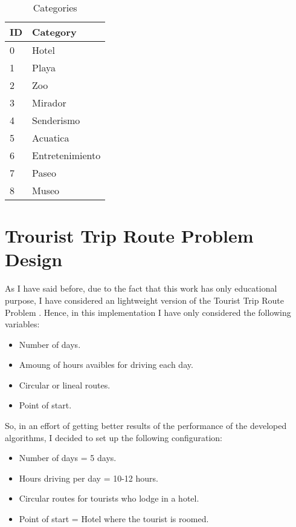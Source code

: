 \documentclass[preprint,14pt]{elsarticle}
\begin{document}
\begin{table}[H]
\centering
\begin{tabular}{@{}|l|l|@{}}
\toprule
ID & Category        \\ \midrule
0  & Hotel           \\ \midrule
1  & Playa           \\ \midrule
2  & Zoo             \\ \midrule
3  & Mirador         \\ \midrule
4  & Senderismo      \\ \midrule
5  & Acuatica        \\ \midrule
6  & Entretenimiento \\ \midrule
7  & Paseo           \\ \midrule
8  & Museo           \\ \bottomrule
\end{tabular}
\caption{Categories}
\label{my-label}
\end{table}

\section{Trourist Trip Route Problem Design}
\label{S:VRP}
As I have said before, due to the fact that this work has only educational purpose, I have considered an lightweight version of the Tourist Trip Route Problem \cite{TTRP1, TTRP2}. Hence, in this implementation I have only considered the following variables:
\begin{itemize}
    \item{Number of days}.
    \item{Amoung of hours avaibles for driving each day}.
    \item{Circular or lineal routes}.
    \item{Point of start}.
\end{itemize}

So, in an effort of getting better results of the performance of the developed algorithms, I decided to set up the following configuration:
\begin{itemize}
    \item Number of days = 5 days.
    \item Hours driving per day = 10-12 hours.
    \item Circular routes for tourists who lodge in a hotel.
    \item Point of start = Hotel where the tourist is roomed.
\end{itemize}
\break
\end{document}
